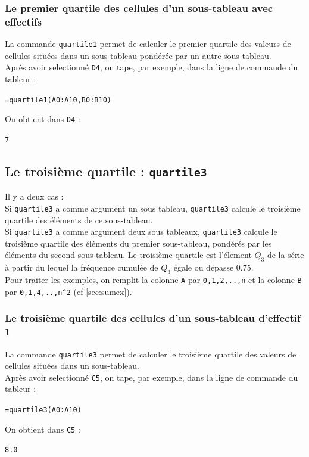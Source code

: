 \documentclass[a4paper,11pt]{book}
\begin{document}
\subsubsection{Le premier quartile  des cellules d'un sous-tableau avec effectifs}
La commande {\tt quartile1} permet de calculer le premier quartile des valeurs
 de  cellules
 situ\'ees dans un sous-tableau pond\'er\'ee par un autre sous-tableau.\\  
Apr\`es avoir selectionn\'e {\tt D4}, on tape, par exemple, dans la ligne de 
commande du tableur :
\begin{center}{\tt =quartile1(A0:A10,B0:B10)}\end{center}
On obtient dans {\tt D4} :
\begin{center}{\tt 7}\end{center}
\subsection{Le troisi\`eme quartile : {\tt quartile3}}
Il y a deux cas :\\
Si {\tt quartile3} a comme argument un sous tableau, {\tt quartile3} calcule le
 troisi\`eme quartile des \'el\'ements de ce sous-tableau.\\
Si {\tt quartile3} a comme argument deux sous tableaux, {\tt quartile3} calcule
 le troisi\`eme quartile  des \'el\'ements du premier sous-tableau, 
pond\'er\'es par les \'el\'ements du second sous-tableau. Le troisi\`eme 
quartile est l'\'element $Q_3$ de la s\'erie \`a partir du lequel la 
fr\'equence cumul\'ee de $Q_3$ \'egale ou d\'epasse 0.75.\\
Pour traiter les exemples,  on remplit la colonne {\tt A} par 
{\tt 0,1,2,..,n} et la colonne 
{\tt B} par {\tt 0,1,4,..,n\verb|^|2} (cf \ref{sec:sumex}).
\subsubsection{Le troisi\`eme quartile des cellules d'un sous-tableau d'effectif 1}
La commande {\tt quartile3} permet de calculer le troisi\`eme quartile
 des valeurs de cellules situ\'ees dans un sous-tableau.\\ 
Apr\`es avoir selectionn\'e {\tt C5}, on tape, par exemple, dans la ligne de 
commande du tableur :
\begin{center}{\tt =quartile3(A0:A10)}\end{center}
On obtient dans {\tt C5} :
\begin{center}{\tt 8.0}\end{center} 
\end{document}

